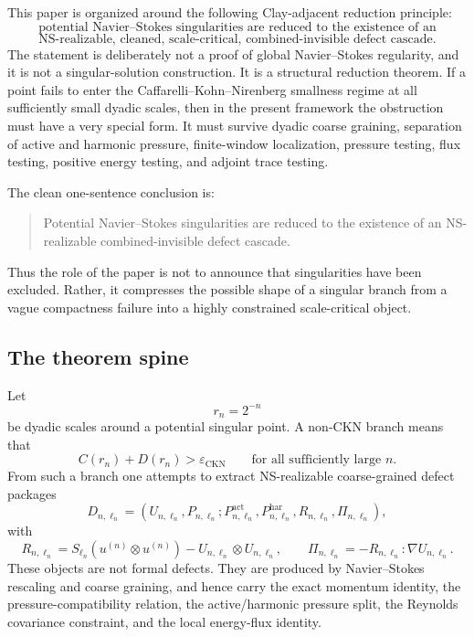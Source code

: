 \documentclass[11pt]{article}
\numberwithin{equation}{section}
\theoremstyle{plain}
\theoremstyle{definition}
\theoremstyle{remark}
\newcommand{\CKN}{\mathrm{CKN}}
\newcommand{\har}{\mathrm{har}}
\newcommand{\act}{\mathrm{act}}
\begin{document}
This paper is organized around the following Clay-adjacent reduction principle:
\[
\boxed{
\text{potential Navier--Stokes singularities are reduced to the existence of an}
}
\]
\[
\boxed{
\text{NS-realizable, cleaned, scale-critical, combined-invisible defect cascade.}
}
\]
The statement is deliberately not a proof of global Navier--Stokes regularity, and it is not a singular-solution construction.  It is a structural reduction theorem.  If a point fails to enter the Caffarelli--Kohn--Nirenberg smallness regime at all sufficiently small dyadic scales, then in the present framework the obstruction must have a very special form.  It must survive dyadic coarse graining, separation of active and harmonic pressure, finite-window localization, pressure testing, flux testing, positive energy testing, and adjoint trace testing.

The clean one-sentence conclusion is:
\begin{quote}
Potential Navier--Stokes singularities are reduced to the existence of an NS-realizable combined-invisible defect cascade.
\end{quote}
Thus the role of the paper is not to announce that singularities have been excluded.  Rather, it compresses the possible shape of a singular branch from a vague compactness failure into a highly constrained scale-critical object.

\subsection*{The theorem spine}

Let
\[
        r_n=2^{-n}
\]
be dyadic scales around a potential singular point.  A non-CKN branch means that
\[
        C(r_n)+D(r_n)>
        \varepsilon_{\CKN}
        \qquad\text{for all sufficiently large } n.
\]
From such a branch one attempts to extract NS-realizable coarse-grained defect packages
\[
        D_{n,\ell_n}
        =
        (U_{n,\ell_n},P_{n,\ell_n};P^{\act}_{n,\ell_n},P^{\har}_{n,\ell_n},R_{n,\ell_n},\Pi_{n,\ell_n}),
\]
with
\[
        R_{n,\ell_n}
        =
        S_{\ell_n}(u^{(n)}\otimes u^{(n)})
        -U_{n,\ell_n}\otimes U_{n,\ell_n},
        \qquad
        \Pi_{n,\ell_n}=-R_{n,\ell_n}:\nabla U_{n,\ell_n}.
\]
These objects are not formal defects.  They are produced by Navier--Stokes rescaling and coarse graining, and hence carry the exact momentum identity, the pressure-compatibility relation, the active/harmonic pressure split, the Reynolds covariance constraint, and the local energy-flux identity.
\end{document}
